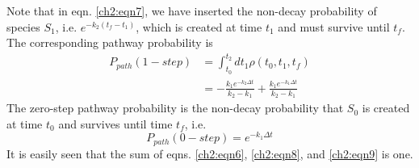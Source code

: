 Note that in eqn. \ref{ch2:eqn7}, we have inserted the non-decay probability of species $S_1$,
i.e. $e^{-k_2(t_f - t_1)}$, which is created at time $t_1$ and must survive until $t_f$. The corresponding
pathway probability is
\begin{equation}
\label{ch2:eqn8}
\begin{split}
P_{path}(1-step) &= \int_{t_0}^{t_2}{dt_1 \rho(t_0, t_1, t_f) } \\
&= - \frac{k_1 e^{- k_2 \Delta t}}{k_2 - k_1} + \frac{k_1 e^{- k_1 \Delta t}}{k_2 - k_1} 
\end{split}
\end{equation}
The zero-step pathway probability is the non-decay probability that $S_0$ is created at time
$t_0$ and survives until time $t_f$, i.e.
\begin{equation}
\label{ch2:eqn9}
P_{path}(0-step) = e^{- k_1 \Delta t}
\end{equation}
It is easily seen that the sum of eqns. \ref{ch2:eqn6}, \ref{ch2:eqn8}, and \ref{ch2:eqn9} is one.
\newline
